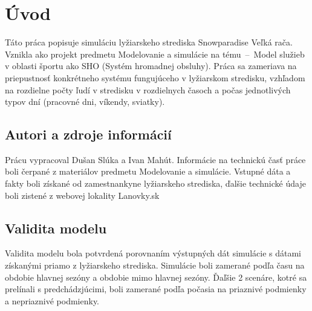 \section{Úvod}
Táto práca popisuje simuláciu lyžiarskeho strediska Snowparadise Veľká rača. Vznikla ako projekt predmetu Modelovanie a simulácie na tému
\,--\, Model služieb v oblasti športu ako SHO (Systém hromadnej obsluhy). Práca sa zameriava na priepustnosť konkrétneho systému fungujúceho v 
lyžiarskom stredisku, vzhľadom na rozdielne počty ľudí v stredisku v rozdielnych časoch a počas jednotlivých typov dní (pracovné dni, víkendy, sviatky).

\subsection{Autori a zdroje informácií}
Prácu vypracoval Dušan Slúka a Ivan Mahút. Informácie na technickú časť práce boli čerpané z materiálov predmetu Modelovanie a simulácie. Vstupné dáta a fakty
boli získané od zamestnankyne lyžiarskeho strediska, ďalšie technické údaje boli zistené z webovej lokality Lanovky.sk\cite{lanovky}

\subsection{Validita modelu}
Validita modelu bola potvrdená porovnaním výstupných dát simulácie s dátami získanými priamo z lyžiarskeho strediska.
Simulácie boli zamerané podľa času na obdobie hlavnej sezóny a obdobie mimo hlavnej sezóny. Ďaľšie 2 scenáre, kotré sa prelínali s predchádzjúcimi,
boli zamerané podľa počasia na priaznivé podmienky a nepriaznivé podmienky.